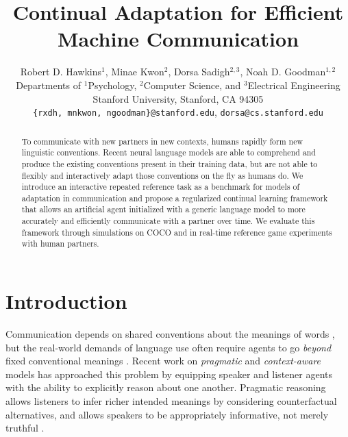 \documentclass[11pt,a4paper]{article}
\title{Continual Adaptation for Efficient Machine Communication}
\author{Robert D. Hawkins$^1$, Minae Kwon$^2$, Dorsa Sadigh$^{2,3}$, Noah D. Goodman$^{1,2}$ \\
  Departments of $^1$Psychology, $^2$Computer Science, and $^3$Electrical Engineering \\
  Stanford University, Stanford, CA 94305 \\
 \texttt{\{rxdh, mnkwon, ngoodman\}@stanford.edu}, \texttt{dorsa@cs.stanford.edu} \\}
\date{}
\begin{document}
\maketitle
\begin{abstract}
To communicate with new partners in new contexts, humans rapidly form new linguistic conventions.
Recent neural language models are able to comprehend and produce the existing conventions present in their training data, but are not able to flexibly and interactively adapt those conventions on the fly as humans do.
We introduce an interactive repeated reference task as a benchmark for models of adaptation in communication and propose a regularized continual learning framework that allows an artificial agent initialized with a generic language model to more accurately and efficiently communicate with a partner over time.
We evaluate this framework through simulations on COCO and in real-time reference game experiments with human partners.
\end{abstract}

\section{Introduction}

Communication depends on shared conventions about the meanings of words \cite{Lewis69_Convention}, but the real-world demands of language use often require agents to go \emph{beyond} fixed conventional meanings  \cite{Grice75_LogicConversation,Davidson86_DerangementOfEpitaphs}.
Recent work on \emph{pragmatic} and \emph{context-aware} models has approached this problem by equipping speaker and listener agents with the ability to explicitly reason about one another. 
Pragmatic reasoning allows listeners to infer richer intended meanings by considering counterfactual alternatives, and allows speakers to be appropriately informative, not merely truthful \cite{GoodmanFrank16_RSATiCS,andreas2016reasoning,fried2017unified,MonroeEtAl17_ColorsInContext,VedantamEtAl17_ContextAwareCaptions}.
\end{document}
